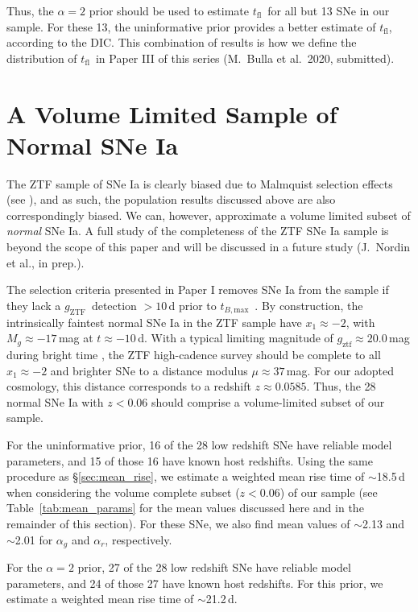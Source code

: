 \documentclass[twocolumn]{aastex63}
\newcommand{\gztf}{$g_\mathrm{ZTF}$}
\newcommand{\tfl}{$t_\mathrm{fl}$}
\newcommand{\tbmax}{$t_{B,\mathrm{max}}$}
\begin{document}
Thus, the $\alpha = 2$ prior should be used to estimate \tfl\ for all but 13
SNe in our sample. For these 13, the uninformative prior provides a better
estimate of \tfl, according to the DIC. This combination of results is how we
define the distribution of \tfl\ in Paper III of this series (M.~Bulla et
al.~2020, submitted).

\section{A Volume Limited Sample of Normal SNe Ia}\label{sec:volume_limited}

The ZTF sample of SNe Ia is clearly biased due to Malmquist selection effects
(see \citealt{Yao19}), and as such, the population results discussed above are
also correspondingly biased. We can, however, approximate a volume limited
subset of \textit{normal} SNe Ia. A full study of the completeness of the ZTF
SNe Ia sample is beyond the scope of this paper and will be discussed in a
future study (J.~Nordin et al., in prep.).

The selection criteria presented in Paper I removes SNe Ia from the sample if
they lack a \gztf\ detection $> 10$\,d prior to \tbmax\ \citep{Yao19}. By
construction, the intrinsically faintest normal SNe Ia in the ZTF sample have
$x_1 \approx -2$, with $M_g \approx -17$\,mag at $t \approx -10$\,d. With a
typical limiting magnitude of $g_\mathrm{ztf} \approx 20.0$\,mag during bright
time \citep{Bellm19}, the ZTF high-cadence survey should be complete to all
$x_1 \approx -2$ and brighter SNe to a distance modulus $\mu \approx 37$\,mag.
For our adopted cosmology, this distance corresponds to a redshift $z \approx
0.0585$. Thus, the 28 normal SNe Ia with $z < 0.06$ should comprise a
volume-limited subset of our sample.

For the uninformative prior, 16 of the 28 low redshift SNe have reliable model
parameters, and 15 of those 16 have known host redshifts. Using the same
procedure as \S\ref{sec:mean_rise}, we estimate a weighted mean rise time of
$\sim$18.5\,d when considering the volume complete subset ($z < 0.06$) of our
sample (see Table~\ref{tab:mean_params} for the mean values discussed here and
in the remainder of this section). For these SNe, we also find mean values of
$\sim$2.13 and $\sim$2.01 for $\alpha_g$ and $\alpha_r$, respectively.

For the $\alpha = 2$ prior, 27 of the 28 low redshift SNe have reliable model
parameters, and 24 of those 27 have known host redshifts. For this prior, we
estimate a weighted mean rise time of $\sim$21.2\,d.
\end{document}
